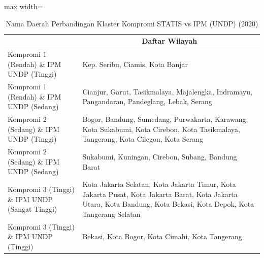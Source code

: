 \begin{table}[H]
\centering
\caption{Nama Daerah Perbandingan Klaster Kompromi STATIS vs IPM (UNDP) (2020)} \label{tab:app1comp_ipm_name_2020}
\begin{adjustbox}{max width=\textwidth}
\begin{tabular}{|>{\centering\arraybackslash}p{4cm}|p{10cm}|}
\hline
\multicolumn{1}{|c|}{\textbf{Kategori}} & \multicolumn{1}{c|}{\textbf{Daftar Wilayah}} \\
\hline
Kompromi 1 (Rendah) \& IPM UNDP (Tinggi) & Kep. Seribu, Ciamis, Kota Banjar \\
\hline
Kompromi 1 (Rendah) \& IPM UNDP (Sedang) & Cianjur, Garut, Tasikmalaya, Majalengka, Indramayu, Pangandaran, Pandeglang, Lebak, Serang \\
\hline
Kompromi 2 (Sedang) \& IPM UNDP (Tinggi) & Bogor, Bandung, Sumedang, Purwakarta, Karawang, Kota Sukabumi, Kota Cirebon, Kota Tasikmalaya, Tangerang, Kota Cilegon, Kota Serang \\
\hline
Kompromi 2 (Sedang) \& IPM UNDP (Sedang) & Sukabumi, Kuningan, Cirebon, Subang, Bandung Barat \\
\hline
Kompromi 3 (Tinggi) \& IPM UNDP (Sangat Tinggi) & Kota Jakarta Selatan, Kota Jakarta Timur, Kota Jakarta Pusat, Kota Jakarta Barat, Kota Jakarta Utara, Kota Bandung, Kota Bekasi, Kota Depok, Kota Tangerang Selatan \\
\hline
Kompromi 3 (Tinggi) \& IPM UNDP (Tinggi) & Bekasi, Kota Bogor, Kota Cimahi, Kota Tangerang \\
\hline
\end{tabular}
\end{adjustbox}
\end{table}